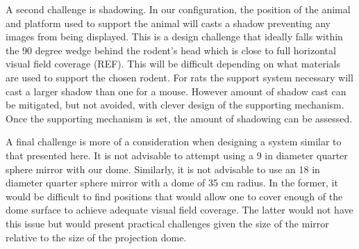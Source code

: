 \documentclass[10pt,letterpaper]{article}
\begin{document}
A second challenge is shadowing. In our configuration, the position of the animal and platform used to support the animal will casts a shadow preventing any images 
from being displayed. This is a design challenge that ideally falls within the 90 degree wedge behind the rodent’s head which is close to full horizontal visual field 
coverage (REF). This will be difficult depending on what materials are used to support the chosen rodent. For rats the support system necessary will cast a larger 
shadow than one for a mouse. However amount of shadow cast can be mitigated, but not avoided, with clever design of the supporting mechanism. Once the 
supporting mechanism is set, the amount of shadowing can be assessed.

A final challenge is more of a consideration when designing a system similar to that presented here. It is not advisable to attempt using a 9 in diameter quarter sphere 
mirror with our dome. Similarly, it is not advisable to use an 18 in diameter quarter sphere mirror with a dome of 35 cm radius. In the former, it would be difficult to find 
positions that would allow one to cover enough of the dome surface to achieve adequate visual field coverage. The latter would not have this issue but would present 
practical challenges given the size of the mirror relative to the size of the projection dome.  
\end{document}
